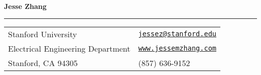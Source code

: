 \documentclass[letterpaper,11pt,oneside]{article}
\begin{document}

\noindent  \LARGE{\textbf{Jesse Zhang}}  \\
\vspace{-2ex}
\hrule
\normalsize


\begin{center}
\begin{tabular}{l l}
 Stanford University    & \hspace{1in} \href{mailto:jessez@stanford.edu}{\texttt{jessez@stanford.edu}} \\
 Electrical Engineering Department    & \hspace{1in}  \href{www.jessemzhang.com}{\texttt{www.jessemzhang.com}}   \\
 Stanford, CA 94305 & \hspace{1in} (857) 636-9152 \\
\end{tabular}
\end{center}


\end{document}
